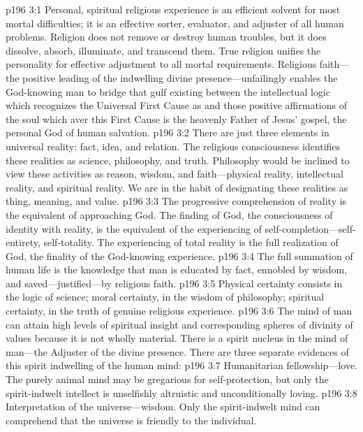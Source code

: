 \vs p196 3:1 Personal, spiritual religious experience is an efficient solvent for most mortal difficulties; it is an effective sorter, evaluator, and adjuster of all human problems. Religion does not remove or destroy human troubles, but it does dissolve, absorb, illuminate, and transcend them. True religion unifies the personality for effective adjustment to all mortal requirements. Religious faith---the positive leading of the indwelling divine presence---unfailingly enables the God\hyp{}knowing man to bridge that gulf existing between the intellectual logic which recognizes the Universal First Cause as  and those positive affirmations of the soul which aver this First Cause is  the heavenly Father of Jesus’ gospel, the personal God of human salvation.
\vs p196 3:2 There are just three elements in universal reality: fact, idea, and relation. The religious consciousness identifies these realities as science, philosophy, and truth. Philosophy would be inclined to view these activities as reason, wisdom, and faith---physical reality, intellectual reality, and spiritual reality. We are in the habit of designating these realities as thing, meaning, and value.
\vs p196 3:3 The progressive comprehension of reality is the equivalent of approaching God. The finding of God, the consciousness of identity with reality, is the equivalent of the experiencing of self\hyp{}completion---self\hyp{}entirety, self\hyp{}totality. The experiencing of total reality is the full realization of God, the finality of the God\hyp{}knowing experience.
\vs p196 3:4 The full summation of human life is the knowledge that man is educated by fact, ennobled by wisdom, and saved---justified---by religious faith.
\vs p196 3:5 Physical certainty consists in the logic of science; moral certainty, in the wisdom of philosophy; spiritual certainty, in the truth of genuine religious experience.
\vs p196 3:6 The mind of man can attain high levels of spiritual insight and corresponding spheres of divinity of values because it is not wholly material. There is a spirit nucleus in the mind of man---the Adjuster of the divine presence. There are three separate evidences of this spirit indwelling of the human mind:
\pc \vs p196 3:7 \bibnobreakspace Humanitarian fellowship---love. The purely animal mind may be gregarious for self\hyp{}protection, but only the spirit\hyp{}indwelt intellect is unselfishly altruistic and unconditionally loving.
\pc \vs p196 3:8 \bibnobreakspace Interpretation of the universe---wisdom. Only the spirit\hyp{}indwelt mind can comprehend that the universe is friendly to the individual.
